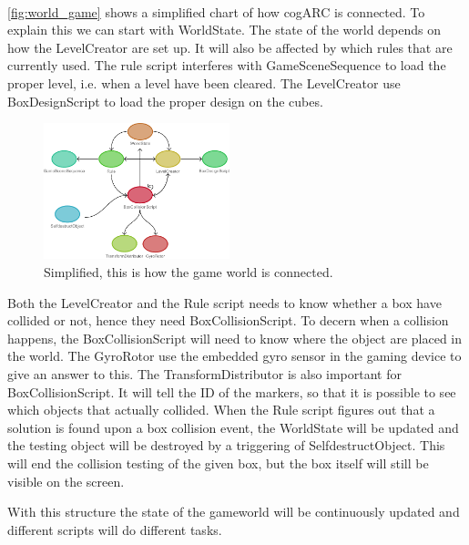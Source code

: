 
\paragraph{}

\autoref{fig:world_game} shows a simplified chart of how cogARC is connected.
To explain this we can start with WorldState. The state of the world depends on
how the LevelCreator are set up. It will also be affected by which rules that
are currently used. 
The rule script interferes with GameSceneSequence to load the proper level,
i.e. when a level have been cleared. The LevelCreator use BoxDesignScript to
load the proper design on the cubes.

\begin{figure}
        \capstart
        \centering
        \includegraphics[width=0.48\textwidth]{images/game_world_class_chart}
        \caption[World game class chart]{Simplified, this is how the game world is connected.}
        \label{fig:world_game}
        \vspace{-10pt}
\end{figure}

Both the LevelCreator and the Rule script needs to know whether a box have
collided or not, hence they need BoxCollisionScript. To decern when a collision
happens, the BoxCollisionScript will need to know where the object are placed
in the world. The GyroRotor use the embedded gyro sensor in the gaming device
to give an answer to this. The TransformDistributor is also important for 
BoxCollisionScript. It will tell the ID of the markers, so that it is possible
to see which objects that actually collided. When the Rule script figures out
that a solution is found upon a box collision event, the WorldState will be
updated and the testing object will be destroyed by a triggering of
SelfdestructObject. This will end the collision testing of the given box, but 
the box itself will still be visible on the screen.

With this structure the state of the gameworld will be continuously updated
and different scripts will do different tasks.

